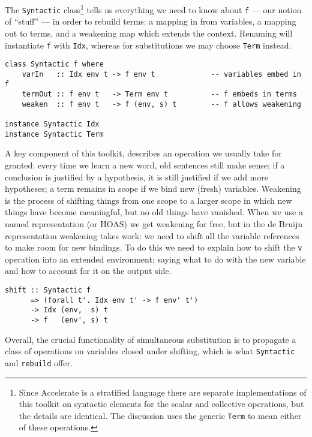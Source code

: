The \texttt{Syntactic} class\footnote{Since Accelerate is a stratified language
there are separate implementations of this toolkit on syntactic elements for the
scalar and collective operations, but the details are identical. The discussion
uses the generic \texttt{Term} to mean either of these operations.} tells us
everything we need to know about \texttt{f} --- our notion of ``stuff'' --- in
order to rebuild terms: a mapping in from variables, a mapping out to terms, and
a weakening map which extends the context. Renaming will instantiate \texttt{f}
with \texttt{Idx}, whereas for substitutions we may choose \texttt{Term}
instead.
%
\begin{lstlisting}[style=haskell]
class Syntactic f where
    varIn   :: Idx env t -> f env t             -- variables embed in f
    termOut :: f env t   -> Term env t          -- f embeds in terms
    weaken  :: f env t   -> f (env, s) t        -- f allows weakening

instance Syntactic Idx
instance Syntactic Term
\end{lstlisting}

A key component of this toolkit,  describes an operation we
usually take for granted: every time we learn a new word, old sentences still
make sense; if a conclusion is justified by a hypothesis, it is still justified
if we add more hypotheses; a term remains in scope if we bind new (fresh)
variables. Weakening is the process of shifting things from one scope to a
larger scope in which new things have become meaningful, but no old things have
vanished. When we use a named representation (or HOAS) we get
weakening for free, but in the de Bruijn representation
weakening takes work: we need to shift all the variable references to make room
for new bindings. To do this we need to explain how to shift the \texttt{v}
operation into an extended environment; saying what to do with the new variable
and how to account for it on the output side.
%
\begin{lstlisting}[style=haskell]
shift :: Syntactic f
      => (forall t'. Idx env t' -> f env' t')
      -> Idx (env,  s) t
      -> f   (env', s) t
\end{lstlisting}
%
Overall, the crucial functionality of simultaneous substitution is to propagate
a class of operations on variables closed under shifting, which is what
\texttt{Syntactic} and \texttt{rebuild} offer.

